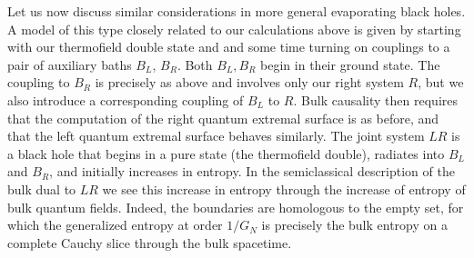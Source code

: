 \documentclass[12pt]{article}
\begin{document}
Let us now discuss similar considerations in more general evaporating black holes. A model of this type closely related to our calculations above is given by starting with our thermofield double state and and some time turning on couplings to a pair of auxiliary baths $B_L$, $B_R$. Both $B_L,B_R$ begin in their ground state.  The coupling to $B_R$ is precisely as above and involves only our right system $R$, but we also introduce a corresponding coupling of $B_L$ to $R$.  Bulk causality then requires that the computation of the right quantum extremal surface is as before, and that the left quantum extremal surface behaves similarly.  The joint system $LR$ is a black hole that begins in a pure state (the thermofield double), radiates into $B_L$ and $B_R$, and initially increases in entropy.  In the semiclassical description of the bulk dual to $LR$ we see this increase in entropy through the increase of entropy of bulk quantum fields.  Indeed, the boundaries are homologous to the empty set, for which the generalized entropy at order $1/G_N$ is precisely the bulk entropy on a complete Cauchy slice through the bulk spacetime.
\end{document}
